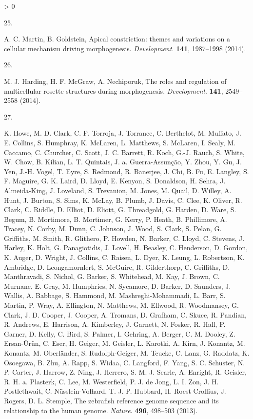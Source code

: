 \documentclass[10pt, b5paper, singlespacinge, twoside]{reedthesis} %
\newlength{\cslhangindent}
\newlength{\csllabelwidth}
\newenvironment{CSLReferences}[3] %
  {%
    \setlength{\parindent}{0pt}
    \ifodd #1 \everypar{\setlength{\hangindent}{\cslhangindent}}\ignorespaces\fi
    \ifnum #2 > 0
    \setlength{\parskip}{#2\baselineskip}
    \fi
  }%
  {}
\newcommand{\CSLLeftMargin}[1]{\parbox[t]{\maxof{\widthof{#1}}{\csllabelwidth}}{#1}}
\newcommand{\CSLRightInline}[1]{\parbox[t]{\linewidth}{#1}}
\theoremstyle{definition}
\theoremstyle{definition}
\theoremstyle{definition}
\theoremstyle{remark}
\begin{document}
\begin{CSLReferences}{0}{0}
\leavevmode\hypertarget{ref-Martin2014}{}%
\CSLLeftMargin{25. }
\CSLRightInline{A. C. Martin, B. Goldstein, {Apical constriction: themes and variations on a cellular mechanism driving morphogenesis.} \emph{Development}. \textbf{141}, 1987--1998 (2014).}

\leavevmode\hypertarget{ref-Harding2014b}{}%
\CSLLeftMargin{26. }
\CSLRightInline{M. J. Harding, H. F. McGraw, A. Nechiporuk, {The roles and regulation of multicellular rosette structures during morphogenesis}. \emph{Development}. \textbf{141}, 2549--2558 (2014).}

\leavevmode\hypertarget{ref-Howe2013a}{}%
\CSLLeftMargin{27. }
\CSLRightInline{K. Howe, M. D. Clark, C. F. Torroja, J. Torrance, C. Berthelot, M. Muffato, J. E. Collins, S. Humphray, K. McLaren, L. Matthews, S. McLaren, I. Sealy, M. Caccamo, C. Churcher, C. Scott, J. C. Barrett, R. Koch, G.-J. Rauch, S. White, W. Chow, B. Kilian, L. T. Quintais, J. a. Guerra-Assunção, Y. Zhou, Y. Gu, J. Yen, J.-H. Vogel, T. Eyre, S. Redmond, R. Banerjee, J. Chi, B. Fu, E. Langley, S. F. Maguire, G. K. Laird, D. Lloyd, E. Kenyon, S. Donaldson, H. Sehra, J. Almeida-King, J. Loveland, S. Trevanion, M. Jones, M. Quail, D. Willey, A. Hunt, J. Burton, S. Sims, K. McLay, B. Plumb, J. Davis, C. Clee, K. Oliver, R. Clark, C. Riddle, D. Elliot, D. Eliott, G. Threadgold, G. Harden, D. Ware, S. Begum, B. Mortimore, B. Mortimer, G. Kerry, P. Heath, B. Phillimore, A. Tracey, N. Corby, M. Dunn, C. Johnson, J. Wood, S. Clark, S. Pelan, G. Griffiths, M. Smith, R. Glithero, P. Howden, N. Barker, C. Lloyd, C. Stevens, J. Harley, K. Holt, G. Panagiotidis, J. Lovell, H. Beasley, C. Henderson, D. Gordon, K. Auger, D. Wright, J. Collins, C. Raisen, L. Dyer, K. Leung, L. Robertson, K. Ambridge, D. Leongamornlert, S. McGuire, R. Gilderthorp, C. Griffiths, D. Manthravadi, S. Nichol, G. Barker, S. Whitehead, M. Kay, J. Brown, C. Murnane, E. Gray, M. Humphries, N. Sycamore, D. Barker, D. Saunders, J. Wallis, A. Babbage, S. Hammond, M. Mashreghi-Mohammadi, L. Barr, S. Martin, P. Wray, A. Ellington, N. Matthews, M. Ellwood, R. Woodmansey, G. Clark, J. D. Cooper, J. Cooper, A. Tromans, D. Grafham, C. Skuce, R. Pandian, R. Andrews, E. Harrison, A. Kimberley, J. Garnett, N. Fosker, R. Hall, P. Garner, D. Kelly, C. Bird, S. Palmer, I. Gehring, A. Berger, C. M. Dooley, Z. Ersan-Ürün, C. Eser, H. Geiger, M. Geisler, L. Karotki, A. Kirn, J. Konantz, M. Konantz, M. Oberländer, S. Rudolph-Geiger, M. Teucke, C. Lanz, G. Raddatz, K. Osoegawa, B. Zhu, A. Rapp, S. Widaa, C. Langford, F. Yang, S. C. Schuster, N. P. Carter, J. Harrow, Z. Ning, J. Herrero, S. M. J. Searle, A. Enright, R. Geisler, R. H. a. Plasterk, C. Lee, M. Westerfield, P. J. de Jong, L. I. Zon, J. H. Postlethwait, C. Nüsslein-Volhard, T. J. P. Hubbard, H. Roest Crollius, J. Rogers, D. L. Stemple, {The zebrafish reference genome sequence and its relationship to the human genome.} \emph{Nature}. \textbf{496}, 498--503 (2013).}


\end{CSLReferences}
\end{document}
